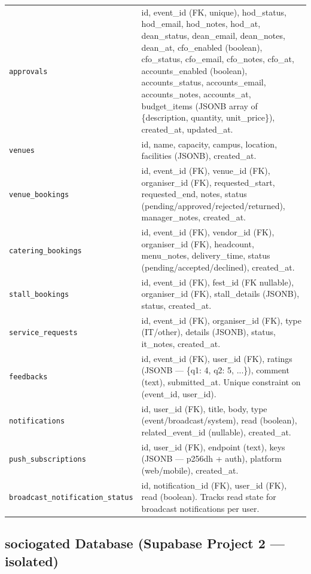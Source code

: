\documentclass[12pt,a4paper]{article}
\begin{document}
\begin{longtable}{L{4cm} X}
\addlinespace
\texttt{approvals} & id, event\_id (FK, unique), hod\_status, hod\_email, hod\_notes, hod\_at, dean\_status, dean\_email, dean\_notes, dean\_at, cfo\_enabled (boolean), cfo\_status, cfo\_email, cfo\_notes, cfo\_at, accounts\_enabled (boolean), accounts\_status, accounts\_email, accounts\_notes, accounts\_at, budget\_items (JSONB array of \{description, quantity, unit\_price\}), created\_at, updated\_at. \\
\addlinespace
\texttt{venues} & id, name, capacity, campus, location, facilities (JSONB), created\_at. \\
\addlinespace
\texttt{venue\_bookings} & id, event\_id (FK), venue\_id (FK), organiser\_id (FK), requested\_start, requested\_end, notes, status (pending/approved/rejected/returned), manager\_notes, created\_at. \\
\addlinespace
\texttt{catering\_bookings} & id, event\_id (FK), vendor\_id (FK), organiser\_id (FK), headcount, menu\_notes, delivery\_time, status (pending/accepted/declined), created\_at. \\
\addlinespace
\texttt{stall\_bookings} & id, event\_id (FK), fest\_id (FK nullable), organiser\_id (FK), stall\_details (JSONB), status, created\_at. \\
\addlinespace
\texttt{service\_requests} & id, event\_id (FK), organiser\_id (FK), type (IT/other), details (JSONB), status, it\_notes, created\_at. \\
\addlinespace
\texttt{feedbacks} & id, event\_id (FK), user\_id (FK), ratings (JSONB — \{q1: 4, q2: 5, ...\}), comment (text), submitted\_at. Unique constraint on (event\_id, user\_id). \\
\addlinespace
\texttt{notifications} & id, user\_id (FK), title, body, type (event/broadcast/system), read (boolean), related\_event\_id (nullable), created\_at. \\
\addlinespace
\texttt{push\_subscriptions} & id, user\_id (FK), endpoint (text), keys (JSONB — p256dh + auth), platform (web/mobile), created\_at. \\
\addlinespace
\texttt{broadcast\_notification\_status} & id, notification\_id (FK), user\_id (FK), read (boolean). Tracks read state for broadcast notifications per user. \\
\bottomrule
\end{longtable}

\subsection{sociogated Database (Supabase Project 2 — isolated)}
\end{document}
